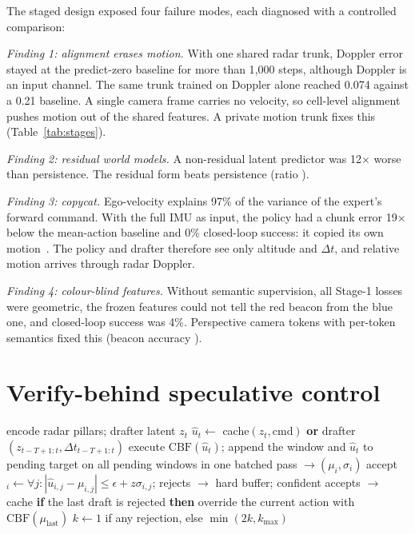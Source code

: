\documentclass[12pt]{article}
\begin{document}
The staged design exposed four failure modes, each diagnosed with a controlled comparison:

\emph{Finding 1: alignment erases motion.} With one shared radar trunk, Doppler error stayed at the predict-zero baseline for more than 1{,}000 steps, although Doppler is an input channel. The same trunk trained on Doppler alone reached 0.074 against a 0.21 baseline. A single camera frame carries no velocity, so cell-level alignment pushes motion out of the shared features. A private motion trunk fixes this (Table~\ref{tab:stages}).

\emph{Finding 2: residual world models.} A non-residual latent predictor was 12$\times$ worse than persistence. The residual form beats persistence (ratio \nceJepaRatio).

\emph{Finding 3: copycat.} Ego-velocity explains 97\% of the variance of the expert's forward command. With the full IMU as input, the policy had a chunk error 19$\times$ below the mean-action baseline and 0\% closed-loop success: it copied its own motion~\citep{dehaan2019causal,wen2020copycat}. The policy and drafter therefore see only altitude and $\Delta t$, and relative motion arrives through radar Doppler.

\emph{Finding 4: colour-blind features.} Without semantic supervision, all Stage-1 losses were geometric, the frozen features could not tell the red beacon from the blue one, and closed-loop success was 4\%. Perspective camera tokens with per-token semantics fixed this (beacon accuracy \nceBeaconPatch).

\section{Verify-behind speculative control}\label{sec:runtime}
\begin{algorithm}[t]
\caption{Verify-behind speculative control (one tick)}\label{alg:vb}
\begin{algorithmic}[1]
\State encode radar pillars; drafter latent $z_t$ 
\State $\hat u_t\gets$ cache$(z_t,\text{cmd})$ \textbf{or} drafter$(z_{t-T+1:t},\Delta t_{t-T+1:t})$ 
\State execute $\mathrm{CBF}(\hat u_t)$; append the window and $\hat u_t$ to pending
 
 \State target on all pending windows in one batched pass $\to(\mu_i,\sigma_i)$
 \State accept$_i\gets\forall j:|\hat u_{i,j}-\mu_{i,j}|\le\epsilon+z\sigma_{i,j}$; rejects $\to$ hard buffer; confident accepts $\to$ cache
 \State \textbf{if} the last draft is rejected \textbf{then} override the current action with $\mathrm{CBF}(\mu_{\text{last}})$
 \State $k\gets1$ if any rejection, else $\min(2k,k_{\max})$
\EndIf
\end{algorithmic}
\end{algorithm}
\end{document}
